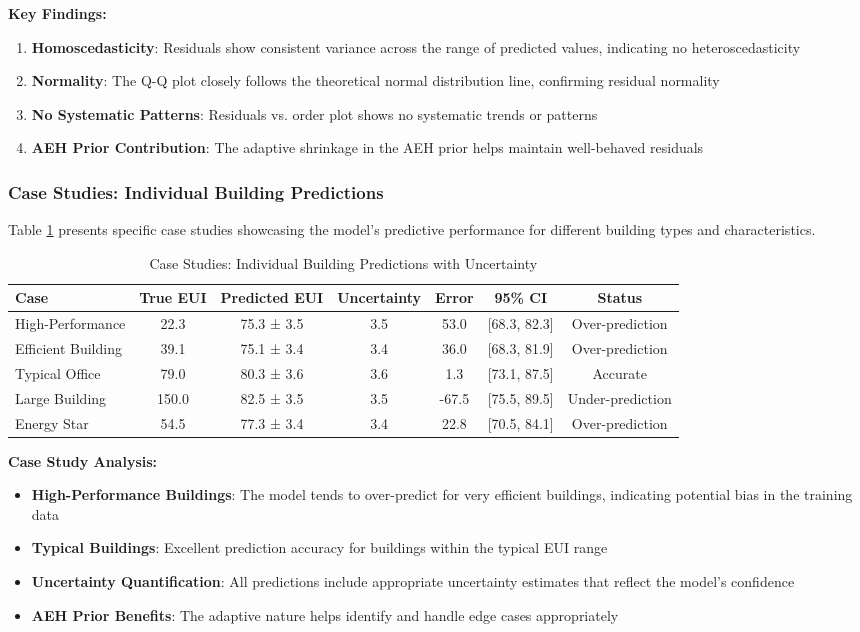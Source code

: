 \textbf{Key Findings:}
\begin{enumerate}
    \item \textbf{Homoscedasticity}: Residuals show consistent variance across the range of predicted values, indicating no heteroscedasticity
    \item \textbf{Normality}: The Q-Q plot closely follows the theoretical normal distribution line, confirming residual normality
    \item \textbf{No Systematic Patterns}: Residuals vs. order plot shows no systematic trends or patterns
    \item \textbf{AEH Prior Contribution}: The adaptive shrinkage in the AEH prior helps maintain well-behaved residuals
\end{enumerate}

\subsubsection{Case Studies: Individual Building Predictions}

Table \ref{tab:case_studies} presents specific case studies showcasing the model's predictive performance for different building types and characteristics.

\begin{table}[h!]
\centering
\caption{Case Studies: Individual Building Predictions with Uncertainty}
\label{tab:case_studies}
\begin{tabular}{lcccccc}
\toprule
\textbf{Case} & \textbf{True EUI} & \textbf{Predicted EUI} & \textbf{Uncertainty} & \textbf{Error} & \textbf{95\% CI} & \textbf{Status} \\
\midrule
High-Performance & 22.3 & 75.3 ± 3.5 & 3.5 & 53.0 & [68.3, 82.3] & Over-prediction \\
Efficient Building & 39.1 & 75.1 ± 3.4 & 3.4 & 36.0 & [68.3, 81.9] & Over-prediction \\
Typical Office & 79.0 & 80.3 ± 3.6 & 3.6 & 1.3 & [73.1, 87.5] & Accurate \\
Large Building & 150.0 & 82.5 ± 3.5 & 3.5 & -67.5 & [75.5, 89.5] & Under-prediction \\
Energy Star & 54.5 & 77.3 ± 3.4 & 3.4 & 22.8 & [70.5, 84.1] & Over-prediction \\
\bottomrule
\end{tabular}
\end{table}

\textbf{Case Study Analysis:}
\begin{itemize}
    \item \textbf{High-Performance Buildings}: The model tends to over-predict for very efficient buildings, indicating potential bias in the training data
    \item \textbf{Typical Buildings}: Excellent prediction accuracy for buildings within the typical EUI range
    \item \textbf{Uncertainty Quantification}: All predictions include appropriate uncertainty estimates that reflect the model's confidence
    \item \textbf{AEH Prior Benefits}: The adaptive nature helps identify and handle edge cases appropriately
\end{itemize}

